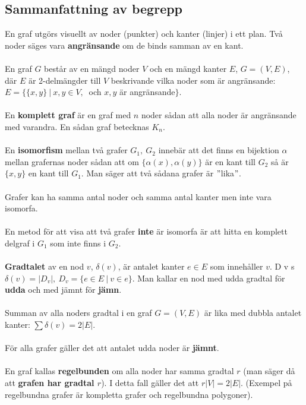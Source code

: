 \documentclass{article}
\begin{document}
\subsection{Sammanfattning av begrepp}
En graf utgörs visuellt av noder (punkter) och kanter (linjer) i ett plan. Två noder säges vara \textbf{angränsande} om de binds samman av en kant.\\ \\ 
En graf $G$ består av en mängd noder $V$ och en mängd kanter $E$, $G=(V,E)$, där $E$ är 2-delmängder till $V$ beskrivande vilka noder som är angränsande: $E=\big\{\{x,y\} \ | \ x,y\in V, \ $ och $x,y$ är angränsande$\big\}$.\\ \\ 
En \textbf{komplett graf} är en graf med $n$ noder sådan att alla noder är angränsande med varandra. En sådan graf betecknas $K_n$.\\ \\ 
En \textbf{isomorfism} mellan två grafer $G_1, \ G_2$ innebär att det finns en bijektion $\alpha$ mellan grafernas noder sådan att om $\{\alpha(x),\alpha(y)\}$ är en kant till $G_2$ så är $\{x,y\}$ en kant till $G_1$. Man säger att två sådana grafer är $"$lika$"$.\\ \\ 
Grafer kan ha samma antal noder och samma antal kanter men inte vara isomorfa.\\ \\ 
En metod för att visa att två grafer \textbf{inte} är isomorfa är att hitta en komplett delgraf i $G_1$ som inte finns i $G_2$.\\ \\ 
\textbf{Gradtalet} av en nod $v$, $\delta(v)$, är antalet kanter $e\in E$ som innehåller $v$. D v s $\delta(v)=|D_v|, \ D_v=\{e\in E \ | \ v\in e\}$. Man kallar en nod med udda gradtal för \textbf{udda} och med jämnt för \textbf{jämn}.\\ \\ 
Summan av alla noders gradtal i en graf $G=(V,E)$ är lika med dubbla antalet kanter: $\sum\delta(v)=2|E|$.\\ \\ 
För alla grafer gäller det att antalet udda noder är \textbf{jämnt}.\\ \\ 
En graf kallas \textbf{regelbunden} om alla noder har samma gradtal $r$ (man säger då att \textbf{grafen har gradtal $r$}). I detta fall gäller det att $r|V|=2|E|$. (Exempel på regelbundna grafer är kompletta grafer och regelbundna polygoner).\\ \\ 
\end{document}
